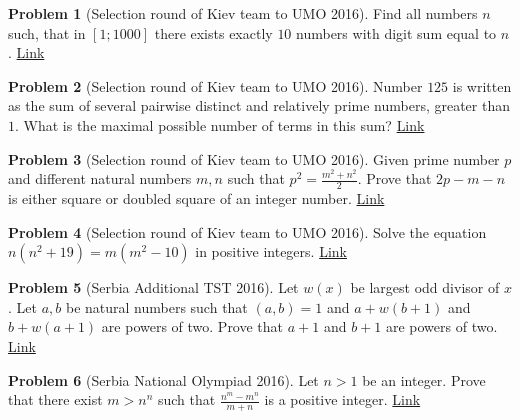 \documentclass[]{article}
\theoremstyle{definition}
\newtheorem{problem}{Problem}
\begin{document}
\begin{problem}[Selection round of Kiev team to UMO 2016]
	Find all numbers $n$ such, that in $[1;1000]$ there exists exactly $10$ numbers with digit sum equal to $n$. \hfill \href{http://artofproblemsolving.com/community/c6h1199874p5893842}{Link}
\end{problem}



\begin{problem}[Selection round of Kiev team to UMO 2016]
	Number $125$ is written as the sum of several pairwise distinct and relatively prime numbers, greater than $1$. What is the maximal possible number of terms in this sum? \hfill \href{http://artofproblemsolving.com/community/c6h1200058p5895479}{Link}
\end{problem}



\begin{problem}[Selection round of Kiev team to UMO 2016]
	Given prime number $p$ and different natural numbers $m, n$ such that $p^2=\frac{m^2+n^2}{2}$. Prove that $2p-m-n$ is either square or doubled square of an integer number. \hfill \href{http://artofproblemsolving.com/community/c6h1199895p5893899}{Link}
\end{problem}




\begin{problem}[Selection round of Kiev team to UMO 2016]
	Solve the equation $n(n^2+19)=m(m^2-10)$ in positive integers. \hfill \href{http://artofproblemsolving.com/community/c6h1202161p5914918}{Link}
\end{problem}



\begin{problem}[Serbia Additional TST 2016]
	Let $w(x)$ be largest odd divisor of $x$. Let $a,b$ be natural numbers such that $(a,b)=1$ and $a+w(b+1)$ and $b+w(a+1)$ are powers of two. Prove that $a+1$ and $b+1$ are powers of two. \hfill \href{http://artofproblemsolving.com/community/c6h1222842p6126065}{Link}
\end{problem}



\begin{problem}[Serbia National Olympiad 2016]
	Let $n>1$ be an integer. Prove that there exist $m>n^n $ such that $\frac {n^m-m^n}{m+n} $ is a positive integer. \hfill \href{http://artofproblemsolving.com/community/c6h1220643p6101949}{Link}
\end{problem}
\end{document}

